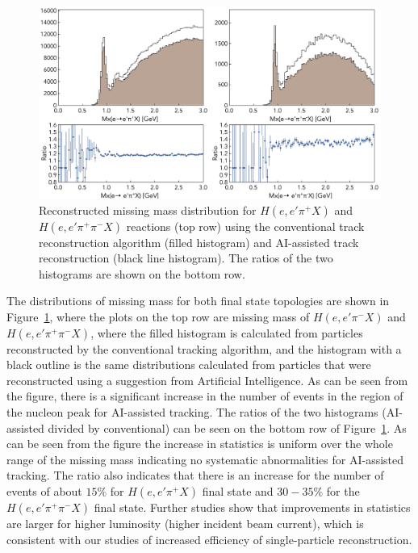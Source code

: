 \documentclass[aps,prl,preprint,12pt]{elsarticle}
\begin{document}
 \begin{figure}[!ht]
\begin{center}
 \includegraphics[width=6.0in]{images/physics_scan.pdf}
\caption {Reconstructed missing mass distribution for $H(e,e'\pi^+X)$ and $H(e,e'\pi^+\pi^-X)$ 
reactions (top row) using the conventional track reconstruction algorithm (filled histogram) and  
AI-assisted track reconstruction (black line histogram). The ratios of the two histograms are shown 
on the bottom row. }
 \label{physics:outcome}
 \end{center}
\end{figure}

The distributions of missing mass for both final state topologies are shown in Figure~\ref{physics:outcome}, where the plots 
on the top row are missing mass of $H(e,e'\pi^-X)$ and $H(e,e'\pi^+\pi^-X)$, where the filled histogram is calculated from 
particles reconstructed by the conventional tracking algorithm, and the histogram with a black outline is the same distributions 
calculated from particles that were reconstructed using a suggestion from Artificial Intelligence. As can be seen from the figure, 
there is a significant increase in the number of events in the region of the nucleon peak for AI-assisted
tracking. The ratios of the two histograms (AI-assisted divided by conventional) can be seen on the bottom row of 
Figure~\ref{physics:outcome}. As can be seen from the figure the increase in statistics is uniform over the whole range of the 
missing mass indicating no systematic abnormalities for AI-assisted tracking. The ratio also indicates that there is an increase 
for the number of events of about $15\%$ for $H(e,e'\pi^+X)$ final state and $30-35\%$ for the $H(e,e'\pi^+\pi^-X)$
final state. Further studies show that improvements in statistics are larger for higher luminosity (higher incident beam current), 
which is consistent with our studies of increased efficiency of single-particle reconstruction.
\end{document}
